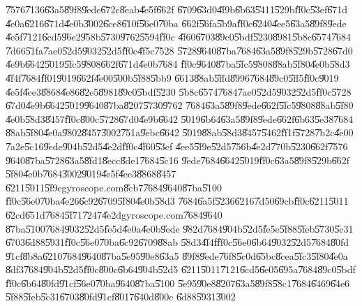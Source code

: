 \bigskip

\U{7576}\U{7136}\U{63a5}\U{89f8}\U{9ede}\U{672c}\U{8eab}\U{4e5f}\U{662f}%
\U{6709}\U{63d0}\U{4f9b}\U{6b63}\U{5411}\U{529b}\U{ff0c}\U{53ef}\U{671d}%
\U{4e0a}\U{6216}\U{671d}\U{4e0b}\U{3002}\U{6ce8}\U{610f}\U{56e0}\U{70ba}%
\U{662f}\U{56fa}\U{5b9a}\U{ff0c}\U{6240}\U{4ee5}\U{63a5}\U{89f8}\U{9ede}%
\U{4e5f}\U{7121}\U{6cd5}\U{96e2}\U{958b}\U{5730}\U{9762}\U{5594}\U{ff0c}%
\U{4f60}\U{6703}\U{89c0}\U{5bdf}\U{5230}\U{8981}\U{5b8c}\U{6574}\U{7684}%
\U{7d66}\U{51fa}\U{7ae0}\U{52d5}\U{9032}\U{52d5}\U{ff0c}\U{4f5c}\U{7528}%
\U{5728}\U{9640}\U{87ba}\U{7684}\U{63a5}\U{89f8}\U{529b}\U{5728}\U{67d0}%
\U{4e9b}\U{6642}\U{5019}\U{5fc5}\U{9808}\U{662f}\U{671d}\U{4e0b}\U{7684}%
\U{ff0c}\U{9640}\U{87ba}\U{5fc5}\U{9808}\U{88ab}\U{5f80}\U{4e0b}\U{58d3}%
\U{4f4f}\U{7684}\U{ff01}\U{9019}\U{662f}\U{4e00}\U{500b}\U{5f88}\U{5bb9}%
\U{6613}\U{88ab}\U{5ffd}\U{8996}\U{7684}\U{89c0}\U{5ff5}\U{ff0c}\U{9019}%
\U{4e5f}\U{4ee3}\U{8868}\U{4e86}\U{82e5}\U{8981}\U{89c0}\U{5bdf}\U{5230}%
\U{5b8c}\U{6574}\U{7684}\U{7ae0}\U{52d5}\U{9032}\U{52d5}\U{ff0c}\U{5728}%
\U{67d0}\U{4e9b}\U{6642}\U{5019}\U{9640}\U{87ba}\U{8207}\U{5730}\U{9762}%
\U{7684}\U{63a5}\U{89f8}\U{9ede}\U{662f}\U{5fc5}\U{9808}\U{88ab}\U{5f80}%
\U{4e0b}\U{58d3}\U{8457}\U{ff0c}\U{800c}\U{5728}\U{67d0}\U{4e9b}\U{6642}%
\U{5019}\U{6b64}\U{63a5}\U{89f8}\U{9ede}\U{662f}\U{6b63}\U{5e38}\U{7684}%
\U{88ab}\U{5f80}\U{4e0a}\U{9802}\U{8457}\U{3002}\U{751a}\U{9ebc}\U{6642}%
\U{5019}\U{88ab}\U{58d3}\U{8457}\U{5462}\U{ff1f}\U{5728}\U{7b2c}\U{4e00}%
\U{7a2e}\U{5c16}\U{9ede}\U{904b}\U{52d5}\U{4e2d}\U{ff0c}\U{4f60}\U{53ef}%
\U{4ee5}\U{5f9e}\U{52d5}\U{756b}\U{4e2d}\U{770b}\U{5230}\U{662f}\U{7576}%
\U{9640}\U{87ba}\U{5728}\U{63a5}\U{8fd1}\U{8ecc}\U{8de1}\U{7684}\U{5c16}%
\U{9ede}\U{7684}\U{6642}\U{5019}\U{ff0c}\U{63a5}\U{89f8}\U{529b}\U{662f}%
\U{5f80}\U{4e0b}\U{7684}\U{3002}\U{9019}\U{4e5f}\U{4ee3}\U{8868}\U{8457}%
\U{6211}\U{5011}\U{5f9e}gyroscope.com\U{8cb7}\U{7684}\U{9640}\U{87ba}\U{5100}%
\U{ff0c}\U{56e0}\U{70ba}\U{4e26}\U{6c92}\U{6709}\U{5f80}\U{4e0b}\U{58d3}%
\U{7684}\U{6a5f}\U{5236}\U{6216}\U{7d50}\U{69cb}\U{ff0c}\U{6211}\U{5011}%
\U{62cd}\U{651d}\U{7684}\U{5f71}\U{7247}\U{4e2d}gyroscope.com\U{7684}\U{9640}%
\U{87ba}\U{5100}\U{7684}\U{9032}\U{52d5}\U{fe5d}\U{4e0a}\U{4e0b}\U{9ede}%
\U{982d}\U{7684}\U{904b}\U{52d5}\U{fe5e}\U{5f88}\U{5feb}\U{5730}\U{5c31}%
\U{6703}\U{6d88}\U{5931}\U{ff0c}\U{56e0}\U{70ba}\U{6c92}\U{6709}\U{88ab}%
\U{58d3}\U{4f4f}\U{ff0c}\U{56e0}\U{6b64}\U{9032}\U{52d5}\U{7684}\U{80fd}%
\U{91cf}\U{8b8a}\U{6210}\U{7684}\U{9640}\U{87ba}\U{5e95}\U{90e8}\U{63a5}%
\U{89f8}\U{9ede}\U{76f8}\U{5c0d}\U{65bc}\U{8cea}\U{5fc3}\U{5f80}\U{4e0a}%
\U{8df3}\U{7684}\U{904b}\U{52d5}\U{ff0c}\U{800c}\U{6b64}\U{904b}\U{52d5}%
\U{6211}\U{5011}\U{7121}\U{6cd5}\U{6e05}\U{695a}\U{7684}\U{89c0}\U{5bdf}%
\U{ff0c}\U{6b64}\U{80fd}\U{91cf}\U{56e0}\U{70ba}\U{9640}\U{87ba}\U{5100}%
\U{5e95}\U{90e8}\U{8207}\U{63a5}\U{89f8}\U{58c1}\U{7684}\U{6469}\U{64e6}%
\U{5f88}\U{5feb}\U{5c31}\U{6703}\U{80fd}\U{91cf}\U{8017}\U{640d}\U{800c}%
\U{6d88}\U{5931}\U{3002}

